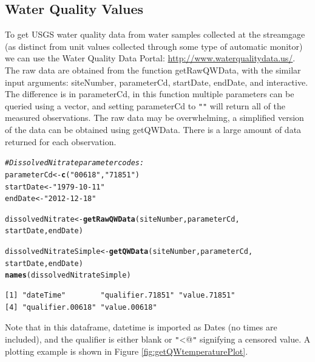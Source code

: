 \documentclass[a4paper,11pt]{article}\usepackage[]{graphicx}\usepackage[]{color}
\makeatletter
\newcommand{\hlstr}[1]{\textcolor[rgb]{0.192,0.494,0.8}{#1}}%
\newcommand{\hlcom}[1]{\textcolor[rgb]{0.678,0.584,0.686}{\textit{#1}}}%
\newcommand{\hlstd}[1]{\textcolor[rgb]{0.345,0.345,0.345}{#1}}%
\newcommand{\hlkwb}[1]{\textcolor[rgb]{0.69,0.353,0.396}{#1}}%
\newcommand{\hlkwd}[1]{\textcolor[rgb]{0.737,0.353,0.396}{\textbf{#1}}}%
\newenvironment{kframe}{%
 \def\at@end@of@kframe{}%
 \ifinner\ifhmode%
  \def\at@end@of@kframe{\end{minipage}}%
  \begin{minipage}{\columnwidth}%
 \fi\fi%
 \def\FrameCommand##1{\hskip\@totalleftmargin \hskip-\fboxsep
 \colorbox{shadecolor}{##1}\hskip-\fboxsep
     \hskip-\linewidth \hskip-\@totalleftmargin \hskip\columnwidth}%
 \MakeFramed {\advance\hsize-\width
   \@totalleftmargin\z@ \linewidth\hsize
   \@setminipage}}%
 {\par\unskip\endMakeFramed%
 \at@end@of@kframe}
\newenvironment{knitrout}{}{} %
\makeatother
\begin{document}
\subsection{Water Quality Values}
\label{sec:usgsWQP}
To get USGS water quality data from water samples collected at the streamgage (as distinct from unit values collected through some type of automatic monitor) we can use the Water Quality Data Portal: \url{http://www.waterqualitydata.us/}. The raw data are obtained from the function  getRawQWData, with the similar input arguments: siteNumber, parameterCd, startDate, endDate, and interactive. The difference is in parameterCd, in this function multiple parameters can be queried using a vector, and setting parameterCd to \texttt{"}\texttt{"} will return all of the measured observations. The raw data may be overwhelming, a simplified version of the data can be obtained using getQWData. There is a large amount of data returned for each observation. 


\begin{knitrout}
\color{fgcolor}\begin{kframe}
\begin{alltt}
\hlcom{# Dissolved Nitrate parameter codes:}
\hlstd{parameterCd} \hlkwb{<-} \hlkwd{c}\hlstd{(}\hlstr{"00618"}\hlstd{,}\hlstr{"71851"}\hlstd{)}
\hlstd{startDate} \hlkwb{<-} \hlstr{"1979-10-11"}
\hlstd{endDate} \hlkwb{<-} \hlstr{"2012-12-18"}

\hlstd{dissolvedNitrate} \hlkwb{<-} \hlkwd{getRawQWData}\hlstd{(siteNumber, parameterCd,}
      \hlstd{startDate, endDate)}

\hlstd{dissolvedNitrateSimple} \hlkwb{<-} \hlkwd{getQWData}\hlstd{(siteNumber, parameterCd,}
        \hlstd{startDate, endDate)}
\hlkwd{names}\hlstd{(dissolvedNitrateSimple)}
\end{alltt}
\begin{verbatim}
[1] "dateTime"        "qualifier.71851" "value.71851"    
[4] "qualifier.00618" "value.00618"    
\end{verbatim}
\end{kframe}
\end{knitrout}


Note that in this dataframe, datetime is imported as Dates (no times are included), and the qualifier is either blank or \texttt{"}\verb@<@\texttt{"} signifying a censored value. A plotting example is shown in Figure \ref{fig:getQWtemperaturePlot}.
\end{document}
